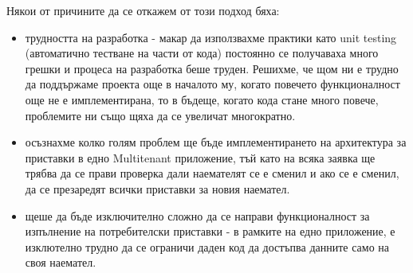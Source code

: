 \documentclass[pdftex,14pt,a4paper]{extreport}
\begin{document}
Някои от причините да се откажем от този подход бяха:
\begin{itemize}
  \item трудността на разработка - макар да използвахме практики като unit testing (автоматично тестване на части от кода) постоянно се получаваха много грешки и процеса на разработка беше труден. Решихме, че щом ни е трудно да поддържаме проекта още в началото му, когато повечето функционалност още не е имплементирана, то в бъдеще, когато кода стане много повече, проблемите ни също щяха да се увеличат многократно.
  \item осъзнахме колко голям проблем ще бъде имплементирането на архитектура за приставки в едно Multitenant приложение, тъй като на всяка заявка ще трябва да се прави проверка дали наемателят се е сменил и ако се е сменил, да се презаредят всички приставки за новия наемател.
  \item щеше да бъде изключително сложно да се направи функционалност за изпълнение на потребителски приставки - в рамките на едно приложение, е изклютелно трудно да се ограничи даден код да достъпва данните само на своя наемател.
\end{itemize}
\end{document}
